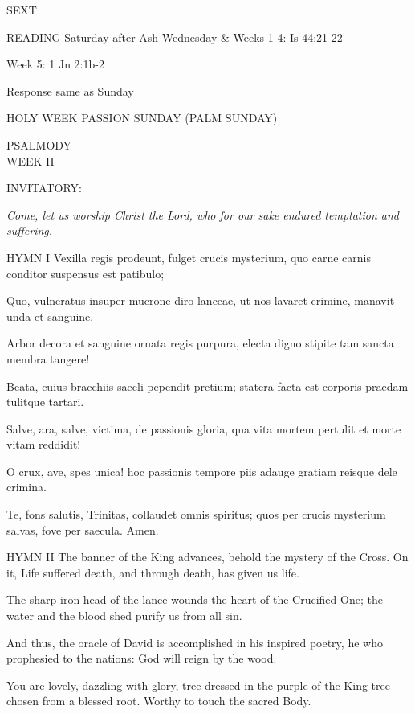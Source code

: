 \begin{flushleft}\normalsize{\uppercase{SEXT\\}}\end{flushleft}
READING
Saturday after Ash Wednesday \& Weeks 1-4:    Is 44:21-22    

Week 5:    1 Jn 2:1b-2    

Response same as Sunday

HOLY WEEK
PASSION SUNDAY
(PALM SUNDAY)

\noindent\small{\uppercase{PSALMODY}\\} WEEK II

\small{\uppercase{INVITATORY:}}\normalsize
\begin{center}
\textit{Come, let us worship Christ the Lord, who for our sake endured temptation and suffering.\\}
\end{center}
HYMN I
Vexilla regis prodeunt,
fulget crucis mysterium,
quo carne carnis conditor
suspensus est patibulo;

Quo, vulneratus insuper 
mucrone diro lanceae,
ut nos lavaret crimine,
manavit unda et sanguine.

Arbor decora et sanguine
ornata regis purpura,
electa digno stipite
tam sancta membra tangere!

Beata, cuius bracchiis
saecli pependit pretium;
statera facta est corporis
praedam tulitque tartari.

Salve, ara, salve, victima,
de passionis gloria,
qua vita mortem pertulit
et morte vitam reddidit!

O crux, ave, spes unica!
hoc passionis tempore
piis adauge gratiam
reisque dele crimina.

Te, fons salutis, Trinitas,
collaudet omnis spiritus;
quos per crucis mysterium
salvas, fove per saecula. Amen.

HYMN II
The banner of the King advances,
behold the mystery of the Cross.
On it, Life suffered death,
and through death, has given us life.

The sharp iron head of the lance
wounds the heart of the Crucified One;
the water and the blood shed
purify us from all sin.

And thus, the oracle of David is accomplished
in his inspired poetry,
he who prophesied to the nations:
God will reign by the wood.

You are lovely, dazzling with glory,
tree dressed in the purple of the King
tree chosen from a blessed root.
Worthy to touch the sacred Body.

